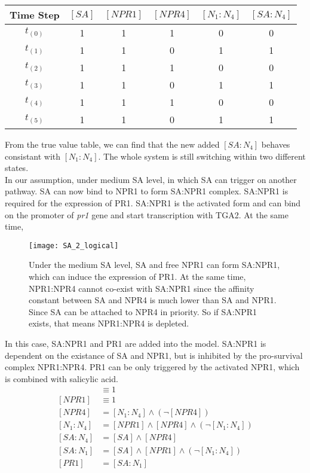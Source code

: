 \begin{tabular}[h]{c c c c c c}
	\hline
	\textsf{\textbf{Time Step}} & \textsf{\textbf{$[SA]$}} & \textsf{\textbf{$[NPR1]$}} & \textsf{\textbf{$[NPR4]$}} & \textsf{\textbf{$[N_1:N_4]$}} & \textsf{\textbf{$[SA:N_4]$}} \\
	\hline
	$t_{(0)}$ & 1 & 1 & 1 & 0 & 0 \\
	$t_{(1)}$ & 1 & 1 & 0 & 1 & 1 \\
	$t_{(2)}$ & 1 & 1 & 1 & 0 & 0 \\
	$t_{(3)}$ & 1 & 1 & 0 & 1 & 1 \\
	$t_{(4)}$ & 1 & 1 & 1 & 0 & 0 \\
	$t_{(5)}$ & 1 & 1 & 0 & 1 & 1 \\
	\hline
\end{tabular}
\linebreak
From the true value table, we can find that the new added $[SA:N_4]$ behaves consistant with $[N_1:N_4]$. The whole system is still switching within two different states.\\
In our assumption, under medium SA level, in which SA can trigger on another pathway. SA can now bind to NPR1 to form SA:NPR1 complex. SA:NPR1 is required for the expression of PR1. SA:NPR1 is the activated form and can bind on the promoter of \textit{pr1} gene and start transcription with TGA2. At the same time, \\
\begin{figure}[H]
	\centering
	\texttt{[image: SA\_2\_logical]}
	\caption{Under the medium SA level, SA and free NPR1 can form  SA:NPR1, which can induce the expression of PR1. At the same time, NPR1:NPR4 cannot co-exist with SA:NPR1 since the affinity constant between SA and NPR4 is much lower than SA and NPR1. Since SA can be attached to NPR4 in priority. So if SA:NPR1 exists, that means NPR1:NPR4 is depleted.}
\end{figure}
In this case, SA:NPR1 and PR1 are added into the model. SA:NPR1 is dependent on the existance of SA and NPR1, but is inhibited by the pro-survival complex NPR1:NPR4. PR1 can be only triggered by the activated NPR1, which is combined with salicylic acid. \\
\begin{align*}
[SA] &\equiv 1 \\
[NPR1] &\equiv 1 \\
[NPR4] &= [N_1:N_4] \wedge (\neg [NPR4]) \\
[N_1:N_4] &= [NPR1] \wedge[NPR4] \wedge (\neg [N_1:N_4]) \\
[SA:N_4] &= [SA] \wedge [NPR4] \\
[SA:N_1] &= [SA] \wedge [NPR1] \wedge (\neg [N_1:N_4]) \\
[PR1] &= [SA:N_1]
\end{align*}
